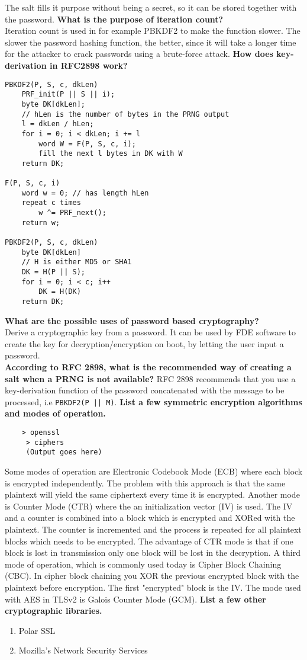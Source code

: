 \documentclass{article}
\begin{document}
The salt fills it purpose without being a secret, so it can be stored together with the password.
\newline
\textbf{What is the purpose of iteration count?}\\
Iteration count is used in for example PBKDF2 to make the function slower. The slower the password hashing function, the better, since it will take a longer time for the attacker to crack passwords using a brute-force attack.
\newline
\textbf{How does key-derivation in RFC2898 work?}\
\begin{verbatim}
PBKDF2(P, S, c, dkLen)
    PRF_init(P || S || i);
    byte DK[dkLen];
    // hLen is the number of bytes in the PRNG output
    l = dkLen / hLen;
    for i = 0; i < dkLen; i += l
        word W = F(P, S, c, i);
        fill the next l bytes in DK with W
    return DK;
    
F(P, S, c, i)
    word w = 0; // has length hLen
    repeat c times
        w ^= PRF_next();
    return w;

PBKDF2(P, S, c, dkLen)
    byte DK[dkLen]
    // H is either MD5 or SHA1
    DK = H(P || S); 
    for i = 0; i < c; i++
        DK = H(DK)
    return DK;
\end{verbatim}
\textbf{What are the possible uses of password based cryptography?}\\
Derive a cryptographic key from a password. It can be used by FDE software to create the key for decryption/encryption on boot, by letting the user input a password.
\\
\textbf{According to RFC 2898, what is the recommended way of creating a salt when a PRNG is not available?}
\newline
RFC 2898 recommends that you use a key-derivation function of the password concatenated with the message to be processed, i.e \verb!PBKDF2(P || M)!.
\newline
\textbf{List a few symmetric encryption algorithms and modes of operation.}
\begin{verbatim}
    > openssl
     > ciphers
     (Output goes here)
\end{verbatim}
Some modes of operation are Electronic Codebook Mode (ECB) where each block is encrypted independently. The problem with this approach is that the same plaintext will yield the same ciphertext every time it is encrypted. Another mode is Counter Mode (CTR) where the an initialization vector (IV) is used. The IV and a counter is combined into a block which is encrypted and XORed with the plaintext. The counter is incremented and the process is repeated for all plaintext blocks which needs to be encrypted. The advantage of CTR mode is that if one block is lost in transmission only one block will be lost in the decryption. A third mode of operation, which is commonly used today is Cipher Block Chaining (CBC). In cipher block chaining you XOR the previous encrypted block with the plaintext before encryption. The first "encrypted" block is the IV. The mode used with AES in TLSv2 is Galois Counter Mode (GCM).
\newline
\textbf{List a few other cryptographic libraries.}
\begin{enumerate}
    \item Polar SSL
    \item Mozilla's Network Security Services
\end{enumerate}
\end{document}
